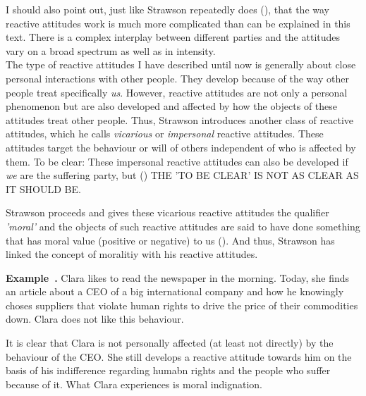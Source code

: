 \documentclass{article}
\newcounter{example}[section]
\newenvironment{example}[1][]{\refstepcounter{example}\par\medskip
   \noindent \textbf{Example~\theexample. #1} \rmfamily}{\medskip}
\begin{document}

I should also point out, just like Strawson repeatedly does (\cite[p.5,
p.7]{Strawson1962}), that the way reactive attitudes work is much more
complicated than can be explained in this text. There is a complex
interplay between different parties and the attitudes vary on a broad spectrum
as well as in intensity.\\

The type of reactive attitudes I have described until now is generally about close
personal interactions with other people. They develop because of the way other
people treat specifically \textit{us}. 
However, reactive attitudes are not only a personal phenomenon but are also developed
and affected by how the objects of these attitudes treat other people.
Thus, Strawson introduces another class of reactive attitudes, which he calls
\textit{vicarious} or \textit{impersonal} reactive attitudes. These attitudes
target the behaviour or will of others independent of who is affected by them.
To be clear: These impersonal reactive attitudes can also be
developed if \textit{we} are the suffering party, but (\cite[p.15]{Strawson1962})
THE 'TO BE CLEAR' IS NOT AS CLEAR AS IT SHOULD BE.

Strawson proceeds and gives these vicarious reactive attitudes the
qualifier \textit{'moral'} and the objects of such reactive attitudes are said
to have done something that has moral value (positive or negative) to us
(\cite[p.15]{Strawson1962}). And thus, Strawson has linked the concept of
moralitiy with his reactive attitudes.


\begin{example}
	Clara likes to read the newspaper in the morning. Today, she finds an
	article about a CEO of a big international company and how he knowingly
	choses suppliers that violate human rights to drive the price of their
	commodities down. Clara does not like this behaviour.
\end{example}


It is clear that Clara is not personally affected (at least not directly) by the
behaviour of the CEO. She still develops a reactive attitude towards him on the
basis of his indifference regarding humabn rights and the people who suffer
because of it. What Clara experiences is moral indignation.
\end{document}
